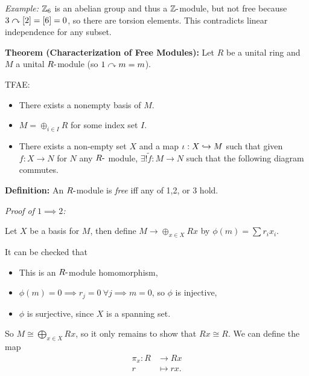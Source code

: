 \emph{Example:} \({\mathbb{Z}}_6\) is an abelian group and thus a
\({\mathbb{Z}}{\hbox{-}}\)module, but not free because \(3 \curvearrowright [2] = [6] = 0\), so
there are torsion elements. This contradicts linear independence for any
subset.

\textbf{Theorem (Characterization of Free Modules):} Let \(R\) be a
unital ring and \(M\) a unital \(R{\hbox{-}}\)module (so \(1\curvearrowright m = m\)).

TFAE:

\begin{itemize}
\item
  There exists a nonempty basis of \(M\).
\item
  \(M = \oplus_{i\in I} R\) for some index set \(I\).
\item
  There exists a non-empty set \(X\) and a map \(\iota: X \hookrightarrow M\)
  such that given \(f: X \to N\) for \(N\) any \(R{\hbox{-}}\) module,
  \(\exists! \tilde f: M \to N\) such that the following diagram
  commutes.
\end{itemize}

\begin{center}
\end{center}

\textbf{Definition:} An \(R{\hbox{-}}\)module is \emph{free} iff any of 1,2,
or 3 hold.

\emph{Proof of \(1 \implies 2\):}

Let \(X\) be a basis for \(M\), then define \(M \to \oplus_{x\in X} Rx\)
by \(\phi(m) = \sum r_i x_i\).

It can be checked that

\begin{itemize}
\item
  This is an \(R{\hbox{-}}\)module homomorphism,
\item
  \(\phi(m) = 0 \implies r_j = 0 ~\forall j \implies m = 0\), so
  \(\phi\) is injective,
\item
  \(\phi\) is surjective, since \(X\) is a spanning set.
\end{itemize}

So \(M \cong \bigoplus_{x\in X} Rx\), so it only remains to show that
\(Rx \cong R\). We can define the map \begin{align*}
\pi_x: R &\to Rx \\
r &\mapsto rx
.\end{align*}

